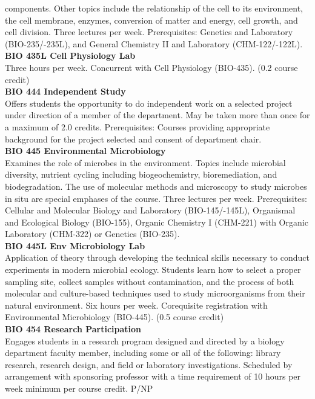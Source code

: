 \documentclass[
  letterpaper,
]{scrbook}
\begin{document}
components. Other topics include the relationship of the cell to its
environment, the cell membrane, enzymes, conversion of matter and
energy, cell growth, and cell division. Three lectures per week.
Prerequisites: Genetics and Laboratory (BIO-235/-235L), and General
Chemistry II and Laboratory (CHM-122/-122L).\\
\textbf{BIO 435L Cell Physiology Lab}\\
Three hours per week. Concurrent with Cell Physiology (BIO-435). (0.2
course credit)\\
\textbf{BIO 444 Independent Study}\\
Offers students the opportunity to do independent work on a selected
project under direction of a member of the department. May be taken more
than once for a maximum of 2.0 credits. Prerequisites: Courses providing
appropriate background for the project selected and consent of
department chair.\\
\textbf{BIO 445 Environmental Microbiology}\\
Examines the role of microbes in the environment. Topics include
microbial diversity, nutrient cycling including biogeochemistry,
bioremediation, and biodegradation. The use of molecular methods and
microscopy to study microbes in situ are special emphases of the course.
Three lectures per week. Prerequisites: Cellular and Molecular Biology
and Laboratory (BIO-145/-145L), Organismal and Ecological Biology
(BIO-155), Organic Chemistry I (CHM-221) with Organic Laboratory
(CHM-322) or Genetics (BIO-235).\\
\textbf{BIO 445L Env Microbiology Lab}\\
Application of theory through developing the technical skills necessary
to conduct experiments in modern microbial ecology. Students learn how
to select a proper sampling site, collect samples without contamination,
and the process of both molecular and culture-based techniques used to
study microorganisms from their natural environment. Six hours per week.
Corequisite registration with Environmental Microbiology (BIO-445). (0.5
course credit)\\
\textbf{BIO 454 Research Participation}\\
Engages students in a research program designed and directed by a
biology department faculty member, including some or all of the
following: library research, research design, and field or laboratory
investigations. Scheduled by arrangement with sponsoring professor with
a time requirement of 10 hours per week minimum per course credit. P/NP
\end{document}
